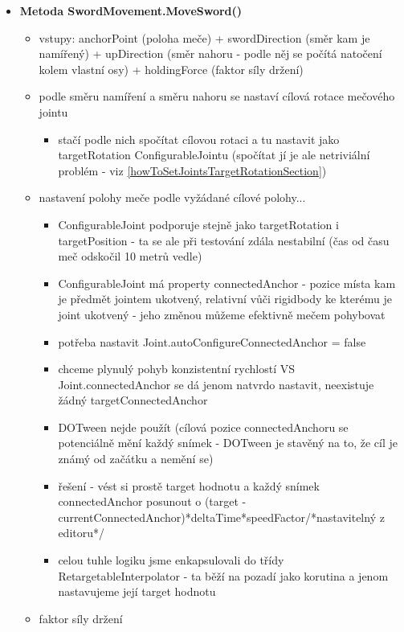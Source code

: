 \begin{itemize}
\begin{itemize}
    \end{itemize}
  \item \textbf{Metoda SwordMovement.MoveSword()}
    \begin{itemize}
      \item vstupy: anchorPoint (poloha meče) + swordDirection (směr kam je namířený) + upDirection (směr nahoru - podle něj se počítá natočení kolem vlastní osy) + holdingForce (faktor síly držení)
      \item podle směru namíření a směru nahoru se nastaví cílová rotace mečového jointu
        \begin{itemize}
          \item stačí podle nich spočítat cílovou rotaci a tu nastavit jako targetRotation ConfigurableJointu (spočítat jí je ale netriviální problém - viz \ref{howToSetJointsTargetRotationSection})
        \end{itemize}
      \item nastavení polohy meče podle vyžádané cílové polohy...
        \begin{itemize}
          \item ConfigurableJoint podporuje stejně jako targetRotation i targetPosition - ta se ale při testování zdála nestabilní (čas od času meč odskočil 10 metrů vedle)
          \item ConfigurableJoint má property connectedAnchor - pozice místa kam je předmět jointem ukotvený, relativní vůči rigidbody ke kterému je joint ukotvený - jeho změnou můžeme efektivně mečem pohybovat
          \item potřeba nastavit Joint.autoConfigureConnectedAnchor = false
          \item chceme plynulý pohyb konzistentní rychlostí VS Joint.connectedAnchor se dá jenom natvrdo nastavit, neexistuje žádný targetConnectedAnchor 
          \item DOTween nejde použít (cílová pozice connectedAnchoru se potenciálně mění každý snímek - DOTween je stavěný na to, že cíl je známý od začátku a nemění se)
          \item řešení - vést si prostě target hodnotu a každý snímek connectedAnchor posunout o (target - currentConnectedAnchor)*deltaTime*speedFactor/*nastavitelný z editoru*/
          \item celou tuhle logiku jsme enkapsulovali do třídy RetargetableInterpolator - ta běží na pozadí jako korutina a jenom nastavujeme její target hodnotu
        \end{itemize}
      \item faktor síly držení

\end{itemize}
\end{itemize}
